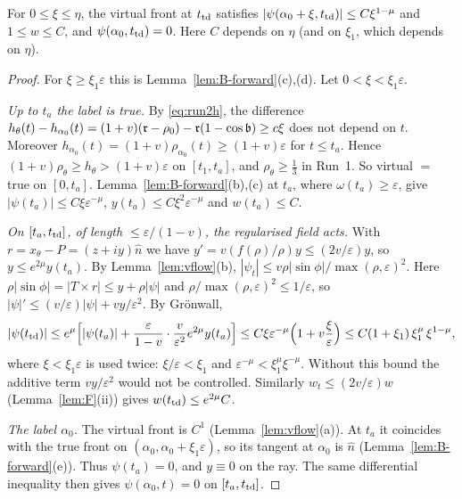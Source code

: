 \begin{lemma}\label{lem:B-virtual}
For $0\le\xi\le\eta$, the virtual front at $t_{\mathrm{td}}$ satisfies $|\psi(\alpha_0+\xi,t_{\mathrm{td}})|\le C\xi^{1-\mu}$ and $1\le w\le C$, and
$\psi(\alpha_0,t_{\mathrm{td}})=0$. Here $C$ depends on $\eta$ (and on $\xi_1$, which depends on $\eta$).
\end{lemma}
\begin{proof}
For $\xi\ge\xi_1\varepsilon$ this is Lemma~\ref{lem:B-forward}(c),(d). Let $0<\xi<\xi_1\varepsilon$.

\emph{Up to $t_a$ the label is true.} By \eqref{eq:run2h}, the difference $h_\theta(t)-h_{\alpha_0}(t)=(1+v)(\mathfrak{r}-\rho_0)-\mathfrak{r}(1-\cos\mathfrak{b})\ge c\xi$
does not depend on $t$. Moreover $h_{\alpha_0}(t)=(1+v)\rho_{\alpha_0}(t)\ge(1+v)\varepsilon$ for $t\le t_a$. Hence
$(1+v)\rho_\theta\ge h_\theta>(1+v)\varepsilon$ on $[t_1,t_a]$, and $\rho_\theta\ge\frac13$ in Run~1. So virtual $=$ true on $[0,t_a]$.
Lemma~\ref{lem:B-forward}(b),(c) at $t_a$, where $\omega(t_a)\ge\varepsilon$, give $|\psi(t_a)|\le C\xi\varepsilon^{-\mu}$,
$y(t_a)\le C\xi^2\varepsilon^{-\mu}$ and $w(t_a)\le C$.

\emph{On $[t_a,t_{\mathrm{td}}]$, of length $\le\varepsilon/(1-v)$, the regularised field acts.} With $r=x_\theta-P=(z+iy)\hat n$ we have
$y'=v(f(\rho)/\rho)y\le(2v/\varepsilon)y$, so $y\le e^{2\mu}y(t_a)$. By Lemma~\ref{lem:vflow}(b),
$|\psi_t|\le v\rho|\sin\phi|/\max(\rho,\varepsilon)^2$. Here $\rho|\sin\phi|=|T\times r|\le y+\rho|\psi|$ and
$\rho/\max(\rho,\varepsilon)^2\le1/\varepsilon$, so $|\psi|'\le(v/\varepsilon)|\psi|+vy/\varepsilon^2$. By Gr\"onwall,
\[
|\psi(t_{\mathrm{td}})|\le e^{\mu}\Bigl[|\psi(t_a)|+\frac{\varepsilon}{1-v}\cdot\frac{v}{\varepsilon^2}e^{2\mu}y(t_a)\Bigr]
\le C\xi\varepsilon^{-\mu}\Bigl(1+v\frac{\xi}{\varepsilon}\Bigr)\le C(1+\xi_1)\,\xi_1^{\mu}\,\xi^{1-\mu},
\]
where $\xi<\xi_1\varepsilon$ is used twice: $\xi/\varepsilon<\xi_1$ and $\varepsilon^{-\mu}<\xi_1^\mu\xi^{-\mu}$. Without this bound the
additive term $vy/\varepsilon^2$ would not be controlled. Similarly $w_t\le(2v/\varepsilon)w$ (Lemma~\ref{lem:F}(ii)) gives
$w(t_{\mathrm{td}})\le e^{2\mu}C$.

\emph{The label $\alpha_0$.} The virtual front is $C^1$ (Lemma~\ref{lem:vflow}(a)). At $t_a$ it coincides with the true front on
$(\alpha_0,\alpha_0+\xi_1\varepsilon)$, so its tangent at $\alpha_0$ is $\hat n$ (Lemma~\ref{lem:B-forward}(e)). Thus $\psi(t_a)=0$, and
$y\equiv0$ on the ray. The same differential inequality then gives $\psi(\alpha_0,t)=0$ on $[t_a,t_{\mathrm{td}}]$.
\end{proof}

